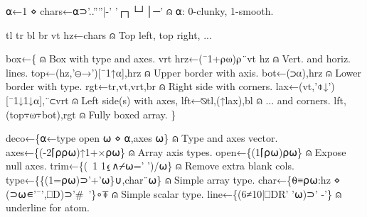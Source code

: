\documentclass{article}%
\begin{document}
        ⍺←1 ⋄ chars←⍺⊃'..''''|-' '┌┐└┘│─'                       ⍝ ⍺: 0-clunky, 1-smooth.

        tl tr bl br vt hz←chars                                                               ⍝ Top left, top right, ...

        box←\{                                                                                                                                 ⍝ Box with type and axes.
                vrt hrz←(¯1+⍴⍵)⍴¨vt hz                                                        ⍝ Vert. and horiz. lines.
                top←(hz,'⊖→')[¯1↑⍺],hrz                                                      ⍝ Upper border with axis.
                bot←(⊃⍺),hrz                                                                                              ⍝ Lower border with type.
                rgt←tr,vt,vrt,br                                                                              ⍝ Right side with corners.
                lax←(vt,'⌽↓')[¯1↓1↓⍺],¨⊂vrt                                     ⍝ Left side(s) with axes,
                lft←⍉tl,(↑lax),bl                                                                         ⍝ ... and corners.
                lft,(top⍪⍵⍪bot),rgt                                                                       ⍝ Fully boxed array.
        \}

        deco←\{⍺←type open ⍵ ⋄ ⍺,axes ⍵\}                           ⍝ Type and axes vector.
        axes←\{(-2⌈⍴⍴⍵)↑1+×⍴⍵\}                                                                  ⍝ Array axis types.
        open←\{(1⌈⍴⍵)⍴⍵\}                                                                                             ⍝ Expose null axes.
        trim←\{(~1 1⍷∧⌿⍵=' ')/⍵\}                                                             ⍝ Remove extra blank cols.
        type←\{\{(1=⍴⍵)⊃'+'⍵\}∪,char¨⍵\}                                     ⍝ Simple array type.
        char←\{⍬≡⍴⍵:hz ⋄ (⊃⍵∊'¯',⎕D)⊃'#~'\}∘⍕          ⍝ Simple scalar type.
        line←\{(6≠10|⎕DR' '⍵)⊃' -'\}                                            ⍝ underline for atom.
\end{document}
